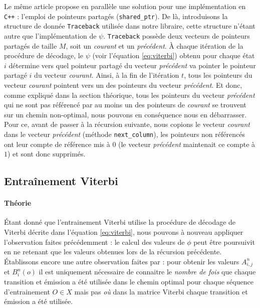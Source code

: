 \documentclass[letterpaper]{article}
\begin{document}
 Le même article propose en parallèle une solution pour une implémentation en \texttt{C++} : l'emploi de pointeurs partagés (\texttt{shared\_ptr}).
De là, introduisons la structure de donnée \texttt{Traceback} utilisée dans notre libraire, cette structure n'étant autre que l'implémentation de $\psi$. \texttt{Traceback} possède deux vecteurs de pointeurs partagés de taille $M$, soit un \textit{courant} et un \textit{précédent}. À chaque itération de la procédure de décodage, le $\psi$ (voir l'équation \ref{eq:viterbi}) obtenu pour chaque état $i$ détermine vers quel pointeur partagé du vecteur \textit{précédent} va pointer le pointeur partagé $i$ du vecteur \textit{courant}. Ainsi, à la fin de l'itération $t$, tous les pointeurs du vecteur \textit{courant} pointent vers un des pointeurs du vecteur \textit{précédent}. Et donc, comme expliqué dans la section théorique, tous les pointeurs du vecteur \textit{précédent} qui ne sont pas référencé par au moins un des pointeurs de \textit{courant} se trouvent sur un chemin non-optimal, nous pouvons en conséquence nous en débarrasser. Pour ce, avant de passer à la récursion suivante, nous copions le vecteur \textit{courant} dans le vecteur \textit{précédent} (méthode \texttt{next\_column}), les pointeurs non référencés ont leur compte de référence mis à $0$ (le vecteur \textit{précédent} maintenait ce compte à $1$) et sont donc supprimés. 

\subsection{Entraînement Viterbi}
\paragraph{Théorie}
Étant donné que l'entrainement Viterbi utilise la procédure de décodage de Viterbi décrite dans l'équation \ref{eq:viterbi}, nous pouvons à nouveau appliquer l'observation faites précédemment : le calcul des valeurs de $\phi$ peut être poursuivit en ne retenant que les valeurs obtenues lors de la récursion précédente.  \\

Établissons encore une autre observation faites par \cite{LM} : pour obtenir les valeurs $A_{i,j}^n$ et $B_i^n(o)$ il est uniquement nécessaire de connaitre le \textit{nombre de fois} que chaque transition et émission a été utilisée dans le chemin optimal pour chaque séquence d'entrainement $O \in X$ mais pas \textit{où} dans la matrice Viterbi chaque transition et émission a été utilisée. \\
\end{document}
